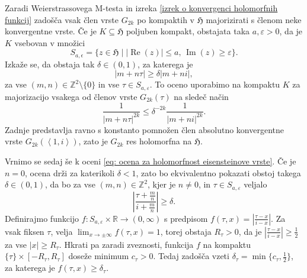 \documentclass[mat1]{fmfdelo}
\numberwithin{equation}{section}
\newcommand{\R}{\mathbb R}
\newcommand{\Z}{\mathbb Z}
\newcommand{\HH}{\mathfrak{H}}
\newcommand{\abs}[1]{\left\lvert #1 \right\rvert}
\newcommand{\lattice}[2]{\left\langle #1, #2 \right\rangle}
\renewcommand\Re{\operatorname{Re}}%
\renewcommand\Im{\operatorname{Im}}%
\theoremstyle{definition}
\begin{document}
\begin{dokaz}
    Zaradi Weierstrassovega M-testa in izreka \ref{izrek o konvergenci holomorfnih funkcij} zadošča vsak člen vrste $G_{2k}$ po kompaktih v $\HH$ majorizirati s členom neke konvergentne vrste. Če je $K \subseteq \HH$ poljuben kompakt, obstajata taka $a, \varepsilon > 0$, da je $K$ vsebovan v množici 
    \[
        S_{a,\epsilon} = \{z \in \HH \mid \abs{\Re(z)} \leq a \text{, } \Im(z) \geq \varepsilon \}.
    \]
    Izkaže se, da obstaja tak $\delta \in (0,1)$, za katerega je
    \begin{equation}
        \label{eq: ocena za holomorfnost eisensteinove vrste}
        \abs{m + n\tau} \geq \delta\abs{m + ni},  
    \end{equation}
    za vse $(m, n) \in \Z^2\setminus\{0\}$ in vse $\tau \in S_{a,\varepsilon}$. To oceno uporabimo na kompaktu $K$ za majorizacijo vsakega od členov vrste $G_{2k}(\tau)$ na sledeč način
    \[
        \frac{1}{\abs{m + n\tau}^{2k}} \leq \delta^{-2k}\frac{1}{\abs{m + ni}^{2k}}.
    \]
    Zadnje predstavlja ravno s konstanto pomnožen člen absolutno konvergentne vrste $G_{2k}(\lattice{1}{i})$, zato je $G_{2k}$ res holomorfna na $\HH$.


    Vrnimo se sedaj še k oceni \eqref{eq: ocena za holomorfnost eisensteinove vrste}. Če je $n = 0$, ocena drži za katerikoli $\delta < 1$, zato bo ekvivalentno pokazati obstoj takega $\delta \in (0,1)$, da bo za vse $(m,n) \in \Z^2$, kjer je $n \neq 0$, in $\tau \in S_{a,\varepsilon}$ veljalo
    \[
        \abs{\frac{\tau + \tfrac{m}{n}}{i + \tfrac{m}{n}}} \geq \delta.
    \]
    Definirajmo funkcijo $f: S_{a, \varepsilon} \times \R \to (0,\infty)$ s predpisom $f(\tau, x) = \abs{\tfrac{\tau - x}{i - x}}$. Za vsak fiksen $\tau$, velja $\lim_{x \to \pm\infty} f(\tau, x) = 1$, torej obstaja $R_\tau > 0$, da je $\abs{\tfrac{\tau - x}{i - x}} \geq \tfrac{1}{2}$ za vse $\abs{x} \geq R_\tau$. Hkrati pa zaradi zveznosti, funkcija $f$ na kompaktu $\{\tau\} \times [-R_\tau, R_\tau]$ doseže minimum $c_\tau > 0$. Tedaj zadošča vzeti $\delta_\tau = \min\{c_\tau, \tfrac{1}{2}\}$, za katerega je $f(\tau, x) \geq \delta_\tau$.


\end{dokaz}
\end{document}
